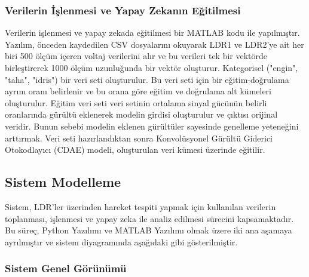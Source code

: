 \subsubsection{Verilerin İşlenmesi ve Yapay Zekanın Eğitilmesi}

Verilerin işlenmesi ve yapay zekada eğitilmesi bir MATLAB kodu ile yapılmıştır. Yazılım, önceden kaydedilen CSV dosyalarını okuyarak LDR1 ve LDR2’ye ait her biri 500 ölçüm içeren voltaj verilerini alır ve bu verileri tek bir vektörde birleştirerek 1000 ölçüm uzunluğunda bir vektör oluşturur. Kategorisel ("engin", "taha", "idris") bir veri seti oluşturulur. Bu veri seti için bir eğitim-doğrulama ayrım oranı belirlenir ve bu orana göre eğitim ve doğrulama alt kümeleri oluşturulur. Eğitim veri seti veri setinin ortalama sinyal gücünün belirli oranlarında gürültü eklenerek modelin girdisi oluşturulur ve çıktısı orijinal veridir. Bunun sebebi modelin eklenen gürültüler sayesinde genelleme yeteneğini arttırmak. Veri seti hazırlandıktan sonra Konvolüsyonel Gürültü Giderici Otokodlayıcı (CDAE) modeli, oluşturulan veri kümesi üzerinde eğitilir.

\subsection{Sistem Modelleme}

Sistem, LDR'ler üzerinden hareket tespiti yapmak için kullanılan verilerin toplanması, işlenmesi ve yapay zeka ile analiz edilmesi sürecini kapsamaktadır. Bu süreç, Python Yazılımı ve MATLAB Yazılımı olmak üzere iki ana aşamaya ayrılmıştır ve sistem diyagramında aşağıdaki gibi gösterilmiştir.

\subsubsection{Sistem Genel Görünümü}

